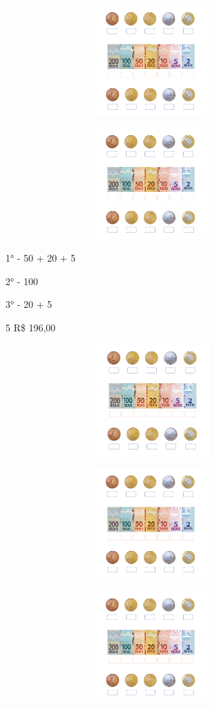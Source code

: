 \includegraphics[width=4.40625in,height=1.66152in]{media/image72.png}

\includegraphics[width=4.40625in,height=1.66152in]{media/image72.png}

1° - 50 + 20 + 5

2° - 100

3° - 20 + 5

\num{5} R\$ 196,00

\includegraphics[width=4.45833in,height=1.68116in]{media/image72.png}

\includegraphics[width=4.40625in,height=1.66152in]{media/image72.png}

\includegraphics[width=4.40625in,height=1.66152in]{media/image72.png}

